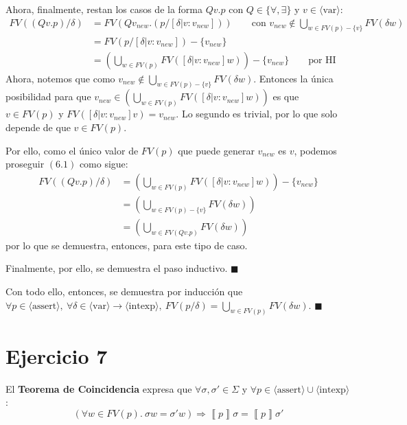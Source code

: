 \documentclass{article}
\newcommand{\aexp}[1]{\langle\text{#1}\rangle}
\newcommand{\intexp}{\aexp{intexp}}
\newcommand{\var}{\aexp{var}}
\newcommand{\assert}{\aexp{assert}}
\newcommand{\sem}[1]{\left\llbracket #1\right\rrbracket}
\begin{document}
\begin{itemize}
	      Ahora, finalmente, restan los casos de la forma $Q v. p$ con $Q \in \{\forall , \exists\}$ y $v \in \var$:
	      \begin{equation*}
		      \tag*{(6.1)}
		      \begin{aligned}
			      FV((Q v. p)/\delta) & = FV(Q v_{new}. (p/[\delta | v : v_{new}]))  \qquad \text{con } v_{new} \notin \bigcup_{w \in FV(p) - \{v\}} FV(\delta w) \\
			                          & = FV(p/[\delta | v : v_{new}]) - \{v_{new}\}                                                                              \\
			                          & = \left(\bigcup_{w \in FV(p)} FV([\delta | v : v_{new}] w)\right) - \{v_{new}\} \qquad \text{por HI}
		      \end{aligned}
	      \end{equation*}
	      Ahora, notemos que como $v_{new} \notin \bigcup_{w \in FV(p) - \{v\}} FV(\delta w)$.
	      Entonces la única posibilidad para que $v_{new} \in \left(\bigcup_{w \in FV(p)} FV([\delta | v : v_{new}] w)\right)$ es que $v \in FV(p)$ y $FV([\delta | v : v_{new}] v) = v_{new}$.
	      Lo segundo es trivial, por lo que solo depende de que $v \in FV(p)$.

	      Por ello, como el único valor de $FV(p)$ que puede generar $v_{new}$ es $v$, podemos proseguir $(6.1)$ como sigue:
	      \begin{equation*}
		      \begin{aligned}
			      FV((Q v. p)/\delta) & = \left(\bigcup_{w \in FV(p)} FV([\delta | v : v_{new}] w)\right) - \{v_{new}\} \\
			                          & = \left(\bigcup_{w \in FV(p) - \{v\}} FV(\delta w)\right)                       \\
			                          & = \left(\bigcup_{w \in FV(Q v. p)} FV(\delta w)\right)
		      \end{aligned}
	      \end{equation*}
	      por lo que se demuestra, entonces, para este tipo de caso.

	      Finalmente, por ello, se demuestra el paso inductivo. $\blacksquare$
\end{itemize}

Con todo ello, entonces, se demuestra por inducción que $\forall p \in \assert,\ \forall \delta \in \var \to \intexp,\ FV(p/\delta) = \bigcup_{w \in FV(p)} FV(\delta w)$. $\blacksquare$

\section*{Ejercicio 7}
El \textbf{Teorema de Coincidencia} expresa que $\forall \sigma, \sigma' \in \Sigma$ y $\forall p \in \assert \cup \intexp$:
\begin{equation*}
	(\forall w \in FV(p).\ \sigma w = \sigma' w) \Rightarrow \sem{p} \sigma = \sem{p} \sigma'
\end{equation*}
\end{document}
